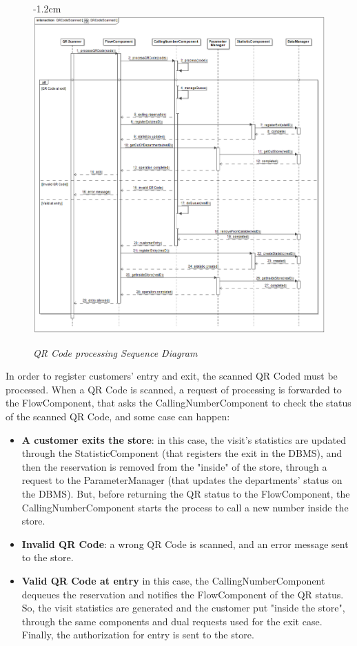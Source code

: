 \documentclass{article}
\begin{document}
	\begin{figure}[H]
		\begin{adjustwidth} {-1.2cm}{}
			\centering
			\includegraphics[scale=0.42]{Sequence Diagrams/sd__QRCodeScanned__QRCodeScanned.png}
		\end{adjustwidth}
		\caption{\emph{QR Code processing Sequence Diagram}}
	\end{figure}	
	In order to register customers' entry and exit, the scanned QR Coded must be processed. When a QR Code is scanned, a request of processing is forwarded to the FlowComponent, that asks the CallingNumberComponent to check the status of the scanned QR Code, and some case can happen:
	\begin{itemize}
		\item{\bfseries A customer exits the store}: in this case, the visit's statistics are updated through the StatisticComponent (that registers the exit in the DBMS), and then the reservation is removed from the "inside" of the store, through a request to the ParameterManager (that updates the departments' status on the DBMS). But, before returning the QR status to the FlowComponent, the CallingNumberComponent starts the process to call a new number inside the store.
		\item{\bfseries Invalid QR Code}: a wrong QR Code is scanned, and an error message sent to the store.
		\item{\bfseries Valid QR Code at entry} in this case, the CallingNumberComponent dequeues the reservation and notifies the FlowComponent of the QR status. So, the visit statistics are generated and the customer put "inside the store", through the same components and dual requests used for the exit case. Finally, the authorization for entry is sent to the store. 
	\end{itemize}
\end{document}
